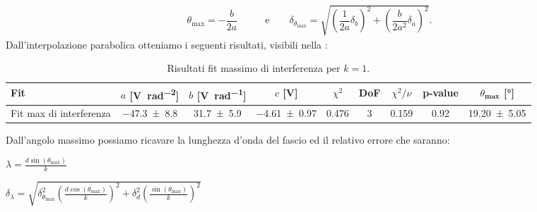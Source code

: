 \documentclass[a4paper]{article}
\begin{document}
\begin{align}
  \theta_{\text{max}} = -\dfrac{b}{2a} \qquad & \text{e}\qquad
  \delta_{\theta_{\text{max}}} = \sqrt{\left(\dfrac{1}{2a}\delta_b\right)^2 + \left(\dfrac{b}{2a^2}\delta_a\right)^2}. \label{eq:angolo_max_doppia_fenditura}
\end{align}
Dall'interpolazione parabolica otteniamo i seguenti risultati, visibili nella :
\begin{table}[htbp]
\centering
\caption{Risultati fit massimo di interferenza per $k=1$.}
\label{tab:fit_doppia_fenditura}
\begin{tabular}{|l|cccccccc|}
\hline
Fit & $a$ [\si{\volt\per\radian\squared}]& $b$ [\si{\volt\per\radian}]& $c$ [\si{\volt}]& $\chi^2$ & DoF & $\chi^2/\nu$ & p-value & $\theta_{\textbf{max}}$ [\si{\degree}] \\\hline\hline
Fit max di interferenza & \SI{-47.3 \pm 8.8}{} & \SI{31.7 \pm 5.9}{} & \SI{-4.61 \pm 0.97}{} & 0.476 & 3 & 0.159 & 0.92 & \SI{19.20 \pm 5.05}{}\\\hline
\end{tabular}
\end{table}
Dall'angolo massimo possiamo ricavare la lunghezza d'onda del fascio ed il relativo errore che saranno:
\begin{minipage}{0.45\textwidth}
\centering
$\lambda = \frac{d \sin(\theta_{\text{max}})}{k}$
\end{minipage}
\hfill
\begin{minipage}{0.45\textwidth}
\centering
$\delta_{\lambda} = \sqrt{ \delta_{\theta_{\text{max}}}^2 \left( \frac{d \cos(\theta_{\text{max}})}{k} \right)^2 + \delta_d^2 \left( \frac{\sin(\theta_{\text{max}})}{k} \right)^2 }$
\end{minipage}
\vspace{\baselineskip}
\end{document}
